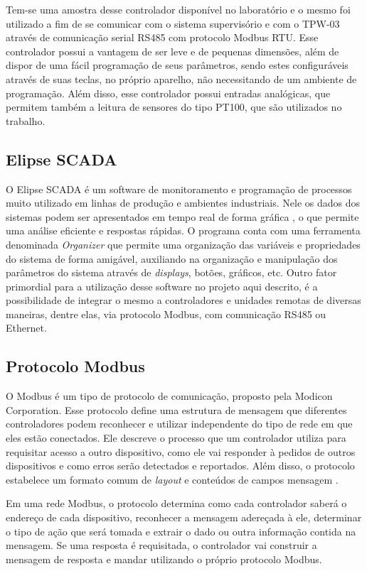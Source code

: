 Tem-se uma amostra desse controlador disponível no laboratório e o mesmo foi utilizado a fim de se comunicar com o sistema supervisório e com o TPW-03 através de comunicação serial RS485 com protocolo Modbus RTU. Esse controlador possui a vantagem de ser leve e de pequenas dimensões, além de dispor de uma fácil programação de seus parâmetros, sendo estes configuráveis através de suas teclas, no próprio aparelho, não necessitando de um ambiente de programação. Além disso, esse controlador possui entradas analógicas, que permitem também a leitura de sensores do tipo PT100, que são utilizados no trabalho.


\subsection{Elipse SCADA}

O Elipse SCADA é um software de monitoramento e programação de processos muito utilizado em linhas de produção e ambientes industriais. Nele os dados dos sistemas podem ser apresentados em tempo real de forma gráfica \cite{elipse2015manual}, o que permite uma análise eficiente e respostas rápidas. O programa conta com uma ferramenta denominada \textit{Organizer} que permite uma organização das variáveis e propriedades do sistema de forma amigável, auxiliando na organização e manipulação dos parâmetros do sistema através de \textit{displays}, botões, gráficos, etc. Outro fator primordial para a utilização desse software no projeto aqui descrito, é a possibilidade de integrar o mesmo a controladores e unidades remotas de diversas maneiras, dentre elas, via protocolo Modbus, com comunicação RS485 ou Ethernet.

\subsection{Protocolo Modbus}

O Modbus é um tipo de protocolo de comunicação, proposto pela Modicon Corporation. Esse protocolo define uma estrutura de mensagem que diferentes controladores podem reconhecer e utilizar independente do tipo de rede em que eles estão conectados. Ele descreve o processo que um controlador utiliza para requisitar acesso a outro dispositivo, como ele vai responder à pedidos de outros dispositivos e como erros serão detectados e reportados. Além disso, o protocolo estabelece um formato comum de \textit{layout} e conteúdos de campos mensagem \cite{modbus1996manual}.

Em uma rede Modbus, o protocolo determina como cada controlador saberá o endereço de cada dispositivo, reconhecer a mensagem adereçada à ele, determinar o tipo de ação que será tomada e extrair o dado ou outra informação contida na mensagem. Se uma resposta é requisitada, o controlador vai construir a mensagem de resposta e mandar utilizando o próprio protocolo Modbus\cite{modbus1996manual}.

